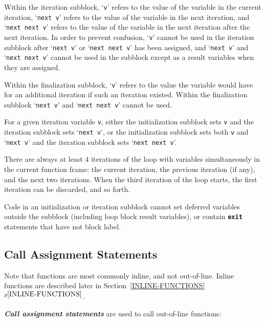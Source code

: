 \documentclass[12pt]{article}
\newcommand{\TT}[1]{{\tt \bfseries #1}}
\newcommand{\ikey}[2]{{\bf \em #1}\index{#2}}
\newcommand{\itemref}[1]{\ref{#1}$^{p\pageref{#1}}$}
\begin{document}
Within the iteration
subblock, `{\tt v}' refers to the value of the variable in the
current iteration, `{\tt next v}' refers to the value of the variable
in the next iteration, and `{\tt next next v}' refers to the
value of the variable in the next iteration after the next iteration.
In order to prevent confusion, `{\tt v}' cannot
be used in the iteration subblock after `{\tt next v}' or
`{\tt next next v}' has been assigned,
and `{\tt next v}' and `{\tt next next v}'
cannot be used in the subblock
except as a result variables when they are assigned.

Within the finalization
subblock, `{\tt v}' refers to the value the variable would have
for an additional iteration if such an iteration existed.
Within the finalization subblock `{\tt next v}' and
`{\tt next next v}' cannot be used.

For a given iteration variable {\tt v},
either the initialization subblock sets {\tt v}
and the iteration subblock sets `{\tt next v}',
or the initialization subblock sets both {\tt v} and `{\tt next v}'
and the iteration subblock sets `{\tt next next v}'.

There are always at least 4 iterations of the loop with variables
simultaneously in the current function frame: the current iteration,
the previous iteration (if any), and the next two iterations.
When the third iteration of the loop starts, the first
iteration can be discarded, and so forth.

Code in an initialization or iteration subblock cannot set
deferred variables outside the subblock (including loop block
result variables), or contain \TT{exit} statements that have
not block label.



\subsection{Call Assignment Statements}
\label{CALL-ASSIGNMENT-STATEMENTS}

Note that functions are most commonly inline, and not out-of-line.
Inline functions are described later in Section~\itemref{INLINE-FUNCTIONS}.

\ikey{Call assignment statements}{call assignment}
are used to call out-of-line functions:
\end{document}
